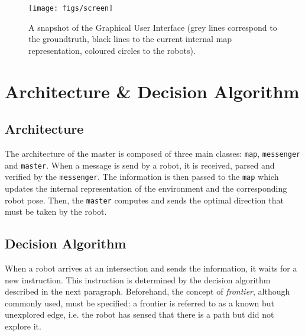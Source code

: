 \documentclass[12pt]{report}
\begin{document}
\begin{figure}[!h]
\centering
\texttt{[image: figs/screen]}
\caption{A snapshot of the Graphical User Interface (grey lines correspond to the groundtruth, black lines to the current internal map representation, coloured circles to the robots).}
\label{fig:gui}
\end{figure}

\section{Architecture \& Decision Algorithm}
\subsection*{Architecture}
The architecture of the master is composed of three main classes: \texttt{map}, \texttt{messenger} and \texttt{master}. When a message is send by a robot, it is received, parsed and verified by the \texttt{messenger}. The information is then passed to the \texttt{map} which updates the internal representation of the environment and the corresponding robot pose. Then, the \texttt{master} computes and sends the optimal direction that must be taken by the robot.

\subsection*{Decision Algorithm}
When a robot arrives at an intersection and sends the information, it waits for a new instruction. This instruction is determined by the decision algorithm described in the next paragraph. Beforehand, the concept of \textit{frontier}, although commonly used, must be specified: a frontier is referred to as a known but unexplored edge, i.e. the robot has sensed that there is a path but did not explore it.
\end{document}
